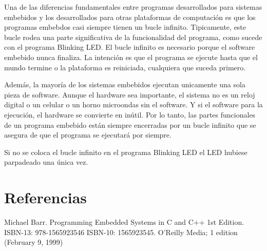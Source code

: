 \documentclass[12pt]{article}
\begin{document}
Una de las diferencias fundamentales entre programas desarrollados para sistemas
embebidos y los desarrollados para otras plataformas de computación es que los programas
embebdos casi siempre tienen un bucle infinito.
Tipicamente, este bucle rodea una parte significativa de la funcionalidad
del programa, como sucede con el programa Blinking LED. El bucle infinito
es necesario porque el software embebido nunca finaliza.
La intención es que el programa se ejecute hasta que el mundo termine
o la plataforma es reiniciada, cualquiera que suceda primero.

Además, la mayoría de los sistemas embebidos ejecutan unicamente una sola
pieza de software. Aunque el hardware sea importante, el sistema
no es un reloj digital o un celular o un horno microondas sin el software.
Y si el software para la ejecución, el hardware se convierte en inútil.
Por lo tanto, las partes funcionales de un programa embebido están siempre
encerradas por un bucle infinito que se asegura de que el programa
se ejecutará por siempre.

Si no se coloca el bucle infinito en el programa Blinking LED el LED hubiese
parpadeado una única vez.

\section*{Referencias}

Michael Barr. Programming Embedded Systems in C and C++ 1st Edition. ISBN-13: 978-1565923546
ISBN-10: 1565923545. O'Reilly Media; 1 edition (February 9, 1999)



\end{document}
